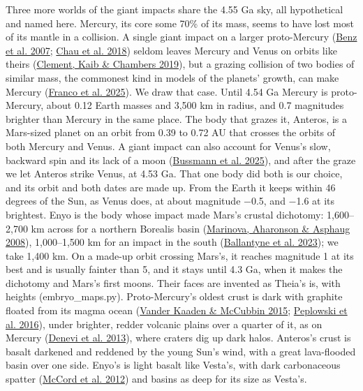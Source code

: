 \documentclass[9pt,twocolumn]{extarticle}
\begin{document}
Three more worlds of the giant impacts share the 4.55 Ga sky, all hypothetical and named here. Mercury, its core some 70\% of its mass, seems to have lost most of its mantle in a collision. A single giant impact on a larger proto-Mercury (\protect\hyperlink{cite.benz2007}{Benz et al. 2007}; \protect\hyperlink{cite.chau2018}{Chau et al. 2018}) seldom leaves Mercury and Venus on orbits like theirs (\protect\hyperlink{cite.clement2019}{Clement, Kaib \& Chambers 2019}), but a grazing collision of two bodies of similar mass, the commonest kind in models of the planets' growth, can make Mercury (\protect\hyperlink{cite.franco2025}{Franco et al. 2025}). We draw that case. Until 4.54 Ga Mercury is proto-Mercury, about 0.12 Earth masses and 3,500 km in radius, and 0.7 magnitudes brighter than Mercury in the same place. The body that grazes it, Anteros, is a Mars-sized planet on an orbit from 0.39 to 0.72 AU that crosses the orbits of both Mercury and Venus. A giant impact can also account for Venus's slow, backward spin and its lack of a moon (\protect\hyperlink{cite.bussmann2025}{Bussmann et al. 2025}), and after the graze we let Anteros strike Venus, at 4.53 Ga. That one body did both is our choice, and its orbit and both dates are made up. From the Earth it keeps within 46 degrees of the Sun, as Venus does, at about magnitude $-$0.5, and $-$1.6 at its brightest. Enyo is the body whose impact made Mars's crustal dichotomy: 1,600--2,700 km across for a northern Borealis basin (\protect\hyperlink{cite.marinova2008}{Marinova, Aharonson \& Asphaug 2008}), 1,000--1,500 km for an impact in the south (\protect\hyperlink{cite.ballantyne2023}{Ballantyne et al. 2023}); we take 1,400 km. On a made-up orbit crossing Mars's, it reaches magnitude 1 at its best and is usually fainter than 5, and it stays until 4.3 Ga, when it makes the dichotomy and Mars's first moons. Their faces are invented as Theia's is, with heights (embryo\_maps.py). Proto-Mercury's oldest crust is dark with graphite floated from its magma ocean (\protect\hyperlink{cite.vanderkaaden2015}{Vander Kaaden \& McCubbin 2015}; \protect\hyperlink{cite.peplowski2016}{Peplowski et al. 2016}), under brighter, redder volcanic plains over a quarter of it, as on Mercury (\protect\hyperlink{cite.denevi2013}{Denevi et al. 2013}), where craters dig up dark halos. Anteros's crust is basalt darkened and reddened by the young Sun's wind, with a great lava-flooded basin over one side. Enyo's is light basalt like Vesta's, with dark carbonaceous spatter (\protect\hyperlink{cite.mccord2012}{McCord et al. 2012}) and basins as deep for its size as Vesta's.
\end{document}
